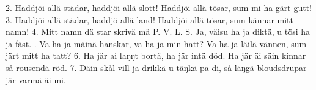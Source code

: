 \begin{multicols}{2}
2.  Haddjöi allä städar, haddjöi allä slott!
    Haddjöi allä tösar, sum mi ha gärt gutt!
3.  Haddjöi allä städar, haddjö allä land!
    Haddjöi allä tösar, sum kännar mitt namn!
4.  Mitt namn dä star skrivä mä P. V. L. S.
    Ja, väisu ha ja diktä, u tösi ha ja fäst.
\vfill{}.  Va ha ja mäinä hanskar, va ha ja min hatt?
    Va ha ja läilä vännen, sum järt mitt ha tatt?
6.  Ha jär ai laŋŋt bortä, ha jär intä död.
    Ha jär äi säin kinnar så rousendä röd.
7.  Däin skål vill ja drikkä u täŋkä pa di,
    så läŋgä bloudsdrupar jär varmä äi mi.
\end{multicols}
